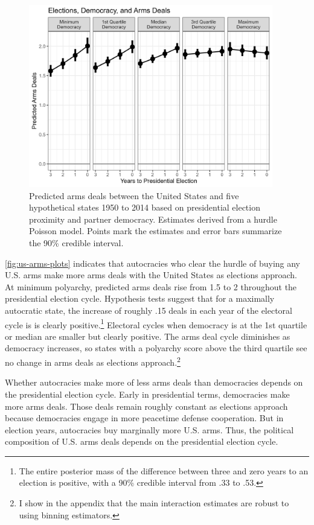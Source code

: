 \documentclass[12pt]{article}
\begin{document}
\begin{figure}[htpb]
	\centering
		\includegraphics[width=0.95\textwidth]{../figures/democ-deals-pred.png}
	\caption{Predicted arms deals between the United States and five hypothetical states 1950 to 2014 based on presidential election proximity and partner democracy. Estimates derived from a hurdle Poisson model. Points mark the estimates and error bars summarize the 90\% credible interval.}
	\label{fig:democ-deals-pred}
\end{figure}


\autoref{fig:us-arms-plots} indicates that autocracies who clear the hurdle of buying any U.S. arms make more arms deals with the United States as elections approach.
At minimum polyarchy, predicted arms deals rise from 1.5 to 2 throughout the presidential election cycle.
Hypothesis tests suggest that for a maximally autocratic state, the increase of roughly .15 deals in each year of the electoral cycle is is clearly positive.\footnote{The entire posterior mass of the difference between three and zero years to an election is positive, with a 90\% credible interval from .33 to .53.}
Electoral cycles when democracy is at the 1st quartile or median are smaller but clearly positive.
The arms deal cycle diminishes as democracy increases, so states with a polyarchy score above the third quartile see no change in arms deals as elections approach.\footnote{I show in the appendix that the main interaction estimates are robust to using binning estimators.}  


Whether autocracies make more of less arms deals than democracies depends on the presidential election cycle. 
Early in presidential terms, democracies make more arms deals. 
Those deals remain roughly constant as elections approach because democracies engage in more peacetime defense cooperation. 
But in election years, autocracies buy marginally more U.S. arms. 
Thus, the political composition of U.S. arms deals depends on the presidential election cycle. 
\end{document}
